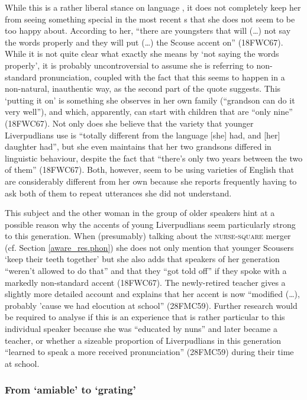 While this is a rather liberal stance on language , it does not completely keep her from seeing something special in the most recent s that she does not seem to be too happy about.
According to her, ``there are youngsters that will (\ldots) not say the words properly and they will put (\ldots) the Scouse accent on'' (18FWC67).
While it is not quite clear what exactly she means by `not saying the words properly', it is probably uncontroversial to assume she is referring to non-standard pronunciation, coupled with the fact that this seems to happen in a non-natural, inauthentic way, as the second part of the quote suggests. This `putting it on' is something she observes in her own family (``grandson can do it very well''), and which, apparently, can start with children that are ``only nine'' (18FWC67).
Not only does she believe that the variety that younger Liverpudlians use is ``totally different from the language [she] had, and [her] daughter had'', but she even maintains that her two grandsons differed in linguistic behaviour, despite the fact that ``there's only two years between the two of them'' (18FWC67).
Both, however, seem to be using varieties of English that are considerably different from her own because she reports frequently having to ask both of them to repeat utterances she did not understand.

This subject and the other woman in the group of older speakers hint at a possible reason why the accents of young Liverpudlians seem particularly strong to this generation.
When (presumably) talking about the \textsc{nurse}-\textsc{square} merger (cf. Section \ref{aware_res.phon}) she does not only mention that younger Scousers `keep their teeth together' but she also adds that speakers of her generation ``weren't allowed to do that'' and that they ``got told off'' if they spoke with a markedly non-standard accent (18FWC67).
The newly-retired teacher gives a slightly more detailed account and explains that her accent is now ``modified (\ldots), probably 'cause we had elocution at school'' (28FMC59).
Further research would be required to analyse if this is an experience that is rather particular to this individual speaker because she was ``educated by nuns'' and later became a teacher, or whether a sizeable proportion of Liverpudlians in this generation ``learned to speak a more received pronunciation'' (28FMC59) during their time at school.

\subsubsection{From `amiable' to `grating'}
\label{aware_res.eval.old.like}

